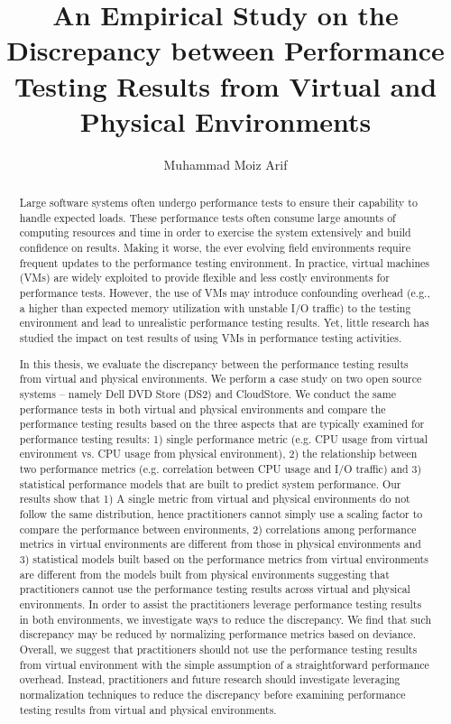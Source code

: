 \documentclass[12pt]{report}
\author{Muhammad Moiz Arif}
\title {An Empirical Study on the Discrepancy between Performance Testing Results from Virtual and Physical Environments}
\begin{document}
\begin{abstract}
Large software systems often undergo performance tests to ensure their capability to handle expected loads. These performance tests often consume large amounts of computing resources and time in order to exercise the system extensively and build confidence on results. Making it worse, the ever evolving field environments require frequent updates to the performance testing environment. In practice, virtual machines (VMs) are widely exploited to provide flexible and less costly environments for performance tests. However, the use of VMs may introduce confounding overhead (e.g., a higher than expected memory utilization with unstable I/O traffic) to the testing environment and lead to unrealistic performance testing results. Yet, little research has studied the impact on test results of using VMs in performance testing activities. 

In this thesis, we evaluate the discrepancy between the performance testing results from virtual and physical environments. We perform a case study on two open source systems -- namely Dell DVD Store (DS2) and CloudStore. We conduct the same performance tests in both virtual and physical environments and compare the performance testing results based on the three aspects that are typically examined for performance testing results: 1) single performance metric (e.g. CPU usage from virtual environment vs. CPU usage from physical environment), 2) the relationship between two performance metrics (e.g. correlation between CPU usage and I/O traffic) and 3) statistical performance models that are built to predict system performance. Our results show that 1) A single metric from virtual and physical environments do not follow the same distribution, hence practitioners cannot simply use a scaling factor to compare the performance between environments,  2) correlations among performance metrics in virtual environments are different from those in physical environments and 3) statistical models built based on the performance metrics from virtual environments are different from the models built from physical environments suggesting that practitioners cannot use the performance testing results across virtual and physical environments. In order to assist the practitioners leverage performance testing results in both environments, we investigate ways to reduce the discrepancy. We find that such discrepancy may be reduced by normalizing performance metrics based on deviance. Overall, we suggest that practitioners should not use the performance testing results from virtual environment with the simple assumption of a straightforward performance overhead. Instead, practitioners and future research should investigate leveraging normalization techniques to reduce the discrepancy before examining performance testing results from virtual and physical environments.


\end{abstract}
\end{document}
